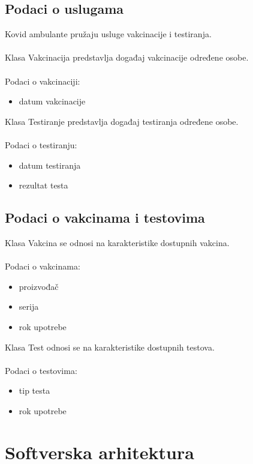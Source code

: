 \documentclass[titlepage]{article}
\begin{document}
\subsection{Podaci o uslugama}
Kovid ambulante pružaju usluge vakcinacije i testiranja. \\ \\ 
Klasa Vakcinacija predstavlja događaj vakcinacije određene osobe. \\ \\
Podaci o vakcinaciji:
\begin{itemize}
    \item datum vakcinacije
\end{itemize}
Klasa Testiranje predstavlja događaj testiranja određene osobe. \\ \\
Podaci o testiranju:
\begin{itemize}
    \item datum testiranja
    \item rezultat testa
\end{itemize}
\subsection{Podaci o vakcinama i testovima}
Klasa Vakcina se odnosi na karakteristike dostupnih vakcina. \\ \\
Podaci o vakcinama:
\begin{itemize}
\item proizvođač 
    \item serija
    \item rok upotrebe
\end{itemize}
Klasa Test odnosi se na karakteristike dostupnih testova. \\ \\
Podaci o testovima:
\begin{itemize}
    \item tip testa
    \item rok upotrebe
\end{itemize}

\section{Softverska arhitektura}
\end{document}
